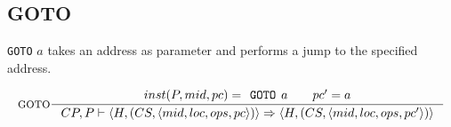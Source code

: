 \subsection{GOTO}
\texttt{GOTO} $a$ takes an address as parameter and performs a jump to the specified address.

$$\inference[GOTO]{
inst(P, mid, pc) = \texttt{GOTO } a \semsp
pc' = a}
{CP, P \vdash \langle H, (CS, \langle mid, loc, ops, pc \rangle)\rangle \Rightarrow \langle H, (CS, \langle mid, loc, ops, pc' \rangle)\rangle}$$

